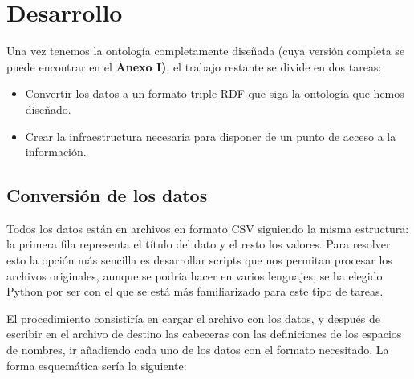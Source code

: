 \chapter{Desarrollo}

Una vez tenemos la ontología completamente diseñada (cuya versión completa se puede encontrar en el \textbf{Anexo I)}, el trabajo restante se divide en dos tareas:

\begin{itemize}
	\item Convertir los datos a un formato triple RDF que siga la ontología que hemos diseñado.
	\item Crear la infraestructura necesaria para disponer de un punto de acceso a la información.
\end{itemize}

\section{Conversión de los datos}

Todos los datos están en archivos en formato CSV siguiendo la misma estructura: la primera fila representa el título del dato y el resto los valores. Para resolver esto la opción más sencilla es desarrollar scripts que nos permitan procesar los archivos originales, aunque se podría hacer en varios lenguajes, se ha elegido Python por ser con el que se está más familiarizado para este tipo de tareas.

\bigskip
El procedimiento consistiría en cargar el archivo con los datos, y después de escribir en el archivo de destino las cabeceras con las definiciones de los espacios de nombres, ir añadiendo cada uno de los datos con el formato necesitado. La forma esquemática sería la siguiente: 

